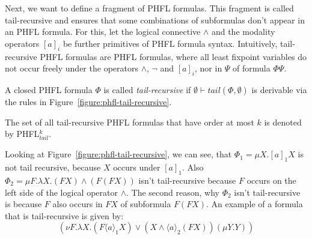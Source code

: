 Next, we want to define a fragment of PHFL formulas. This fragment is called tail-recursive and ensures that
some combinations of subformulas don't appear in an PHFL formula. For this, let the logical connective
$\wedge$ and the modality operators $[a]_i$ be further primitives of PHFL formula syntax. Intuitively, tail-recursive
PHFL formulas are PHFL formulas, where all least fixpoint variables do not occur freely under the operators
$\wedge$, $\neg$ and $[a]_i$, nor in $\Psi$ of formula $\Phi\Psi$.

\begin{definition}
    A closed PHFL formula $\Phi$ is called \emph{tail-recursive} if $\emptyset \vdash tail(\Phi, \emptyset)$ is
    derivable via the rules in Figure~\ref{figure:phfl-tail-recursive}.
\end{definition}

The set of all tail-recursive PHFL formulas that have order at most $k$ is denoted by PHFL$^k_{tail}$.

\begin{example}{\cite{lange2014capturing}}
    Looking at Figure~\ref{figure:phfl-tail-recursive}, we can see, that $\Phi_1 = \mu X.[a]_1 X$ is not tail
    recursive, because $X$ occurs under $[a]_1$. Also $\Phi_2 = \mu F .\lambda X. (F X) \wedge (F(F X))$
    isn't tail-recursive because $F$ occurs on the left side of the logical operator $\wedge$. The second reason, why
    $\Phi_2$ isn't tail-recursive is because $F$ also occurs in $F X$ of subformula $F (F X)$. An example of a
    formula that is tail-recursive is given by:
    \[(\nu F. \lambda X. (F \langle a \rangle_1 X) \vee (X \wedge \langle a \rangle_2 (F X)) (\mu Y.Y))\]
\end{example}